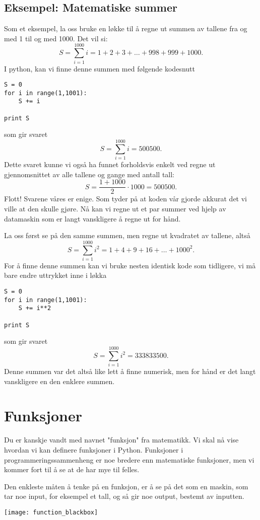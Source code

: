 \documentclass[a4paper, 11pt, notitlepage, english]{article}
\begin{document}
\subsection{Eksempel: Matematiske summer}
Som et eksempel, la oss bruke en løkke til å regne ut summen av tallene fra og med 1 til og med 1000. Det vil si:
$$S = \sum_{i=1}^{1000} i = 1 + 2 + 3 + \ldots + 998 + 999 + 1000.$$
I python, kan vi finne denne summen med følgende kodesnutt
\begin{lstlisting}
S = 0
for i in range(1,1001):
    S += i

print S
\end{lstlisting}
\vspace{-0.3cm}
som gir svaret
$$S = \sum_{i=1}^{1000} i = 500500.$$
Dette svaret kunne vi også ha funnet forholdsvis enkelt ved regne ut gjennomsnittet av alle tallene og gange med antall tall:
$$S = \frac{1+1000}{2}\cdot 1000 = 500500.$$
Flott! Svarene våres er enige. Som tyder på at koden vår gjorde akkurat det vi ville at den skulle gjøre. Nå kan vi regne ut et par summer ved hjelp av datamaskin som er langt vanskligere å regne ut for hånd.

La oss først se på den samme summen, men regne ut kvadratet av tallene, altså
$$S = \sum_{i=1}^{1000} i^2 = 1 + 4 + 9 + 16 + \ldots + 1000^2.$$
For å finne denne summen kan vi bruke nesten identisk kode som tidligere, vi må bare endre uttrykket inne i løkka
\begin{lstlisting}
S = 0
for i in range(1,1001):
    S += i**2

print S
\end{lstlisting}
\vspace{-0.3cm}
som gir svaret
$$S = \sum_{i=1}^{1000} i^2 = 333833500.$$
Denne summen var det altså like lett å finne numerisk, men for hånd er det langt vanskligere en den enklere summen.

\clearpage


\section{Funksjoner}
Du er kanskje vandt med navnet "funksjon" fra matematikk. Vi skal nå vise hvordan vi kan definere funksjoner i Python. Funksjoner i programmeringssammenheng er noe bredere enn matematiske funksjoner, men vi kommer fort til å se at de har mye til felles.

Den enkleste måten å tenke på en funksjon, er å se på det som en maskin, som tar noe input, for eksempel et tall, og så gir noe output, bestemt av inputten.
\begin{center}
\texttt{[image: function\_blackbox]}    
\end{center}
\end{document}
